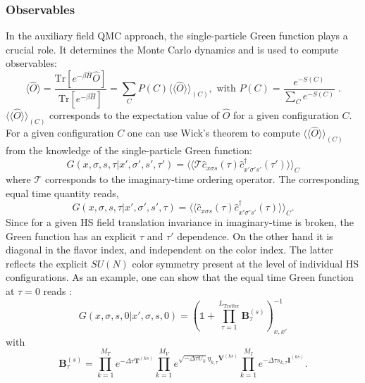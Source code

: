 \documentclass{SciPost}
\begin{document}
\subsubsection{Observables}\label{Observables.General}
%
In the auxiliary field QMC approach, the single-particle Green function plays a crucial role.  It determines the Monte Carlo dynamics and is used to compute  observables:
\begin{equation}\label{eqn:obs}
\langle \hat{O}  \rangle  = \frac{ \text{Tr}   \left[ e^{- \beta \hat{H}}  \hat{O}   \right] }{ \text{Tr}   \left[ e^{- \beta \hat{H}}  \right] } =   \sum_{C}   P(C) 
   \langle \langle \hat{O}  \rangle \rangle_{(C)} , \text{   with   } 
  P(C)   = \frac{ e^{-S(C)}}{\sum_C e^{-S(C)}}\;.
\end{equation}
$\langle \langle \hat{O}  \rangle \rangle_{(C)} $ corresponds to the expectation value of  $\hat{O}$ for a given configuration $C$.
For a given configuration $C$  one can use Wick's theorem to compute $ \langle \langle \hat{O}  \rangle \rangle_{(C)}  $   from the knowledge of the single-particle Green function: 
\begin{equation}
       G( x,\sigma,s, \tau |    x',\sigma',s', \tau')   =       \langle \langle \mathcal{T} \hat{c}^{\phantom\dagger}_{x \sigma s} (\tau)  \hat{c}^{\dagger}_{x' \sigma' s'} (\tau') \rangle \rangle_{C}
\end{equation}
where $ \mathcal{T} $ corresponds to the imaginary-time ordering operator.   The  corresponding equal time quantity reads, 
\begin{equation}
       G( x,\sigma,s, \tau |    x',\sigma',s', \tau)   =       \langle \langle  \hat{c}^{\phantom\dagger}_{x \sigma s} (\tau)  \hat{c}^{\dagger}_{x' \sigma' s'} (\tau) \rangle \rangle_{C}.
\end{equation}
Since  for a given HS field translation invariance in imaginary-time is broken, the Green function has an explicit $\tau$ and $\tau'$ dependence.   On the other hand it is diagonal in the flavor index, and independent on the color index. The latter reflects the  explicit $SU(N)$   color symmetry present at the level of individual HS configurations.   As an example,  one can show that the equal time Green function at $\tau = 0$ reads \cite{Assaad08_rev}:
\begin{equation}\label{eqn:Green_eq}
G(x,\sigma,s,0| x',\sigma,s,0 )  =   \left(  \mathds{1}  +  \prod_{\tau = 1}^{L_{\text{Trotter}}}  \bm{B}_{\tau}^{(s)}   \right)^{-1}_{x,x'}
\end{equation}
with
\begin{equation}
	\bm{B}_{\tau}^{(s)} =  \prod_{k=1}^{M_T}   e^{-\Delta \tau {\bm T}^{(ks)}}  
    \prod_{k=1}^{M_V}   e^{  \sqrt{ -\Delta \tau  U_k} \eta_{k,\tau} {\bm V}^{(ks)} }   \prod_{k=1}^{M_I}   e^{  -\Delta \tau s_{k,\tau}  {\bm I}^{(ks)}}.
\end{equation}
\end{document}
